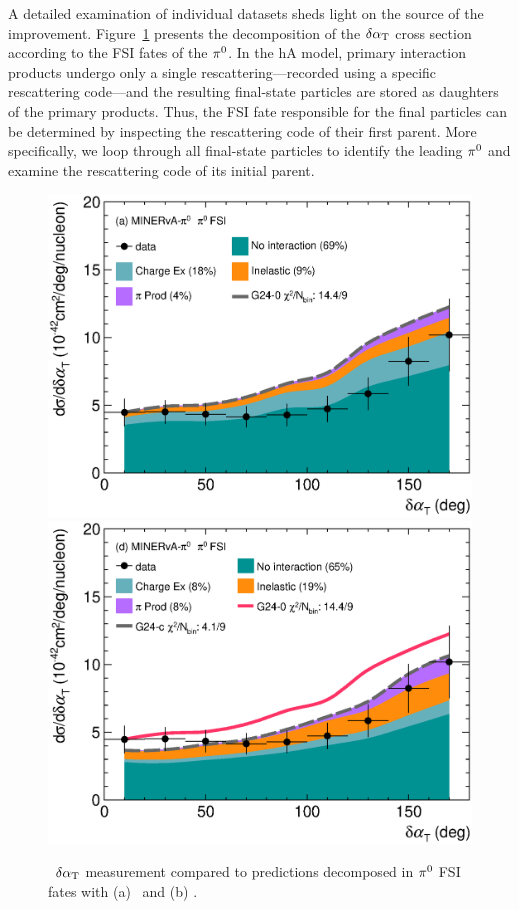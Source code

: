    A detailed examination of individual datasets sheds light on the source of the improvement. 
    Figure~\ref{fig:CEX-minpiz-dat-pi0} presents the decomposition of the $\delta\alpha_\textrm{T}$ cross section according to the FSI fates of the $\pi^0$. 
    In the hA model, primary interaction products undergo only a single rescattering—recorded using a specific rescattering code—and the resulting final-state particles are stored as daughters of the primary products. 
    Thus, the FSI fate responsible for the final particles can be determined by inspecting the rescattering code of their first parent. 
    More specifically, we loop through all final-state particles to identify the leading $\pi^0$ and examine the rescattering code of its initial parent. 
    \begin{figure}[!htb] 	
        \centering 		
        \includegraphics[width=\dbfigwid\textwidth]{figures/tuning/0000-min_pi0_dalphat_pi0_decomp_cex.eps}
        \includegraphics[width=\dbfigwid\textwidth]{figures/tuning/0026-min_pi0_dalphat_pi0_decomp_covfix.eps}	
        \caption{\label{fig:CEX-minpiz-dat-pi0} \minpiz\ $\delta\alpha_\textrm{T}$ measurement compared to \genie predictions decomposed in $\pi^0$ FSI fates with (a) \gZero\ and (b) \gC.} 
    \end{figure}

